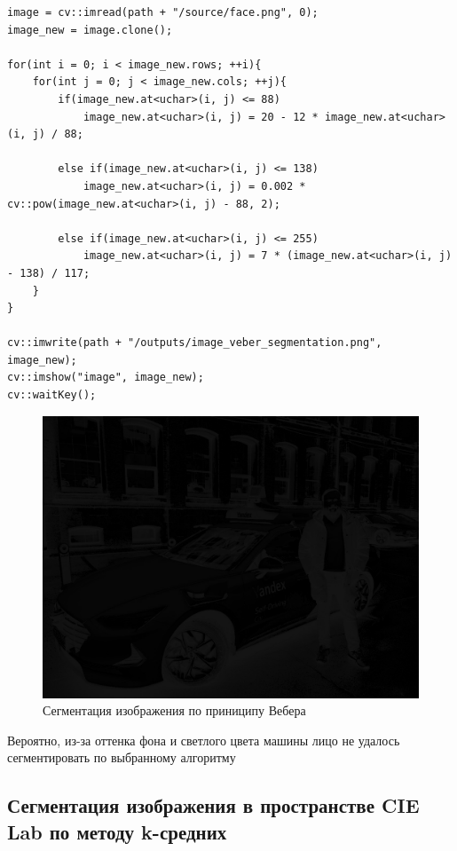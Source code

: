 \begin{lstlisting}[style=cpp_white, caption={Исходный код для сегментации по принципу Вебера}]
image = cv::imread(path + "/source/face.png", 0);
image_new = image.clone();

for(int i = 0; i < image_new.rows; ++i){
    for(int j = 0; j < image_new.cols; ++j){
        if(image_new.at<uchar>(i, j) <= 88)
            image_new.at<uchar>(i, j) = 20 - 12 * image_new.at<uchar>(i, j) / 88;   
        
        else if(image_new.at<uchar>(i, j) <= 138)
            image_new.at<uchar>(i, j) = 0.002 * cv::pow(image_new.at<uchar>(i, j) - 88, 2); 
        
        else if(image_new.at<uchar>(i, j) <= 255)
            image_new.at<uchar>(i, j) = 7 * (image_new.at<uchar>(i, j) - 138) / 117; 
    }
}

cv::imwrite(path + "/outputs/image_veber_segmentation.png", image_new);
cv::imshow("image", image_new);
cv::waitKey();
\end{lstlisting}

\begin{figure}[ht]
    \includegraphics[width=\textwidth]{../outputs/image_veber_segmentation.png}
    \caption{Сегментация изображения по приниципу Вебера}
    \label{fig:р}
\end{figure}

Вероятно, из-за оттенка фона и светлого цвета машины лицо не удалось сегментировать по выбранному алгоритму

\subsection{Сегментация изображения в пространстве CIE Lab по методу k-средних}

